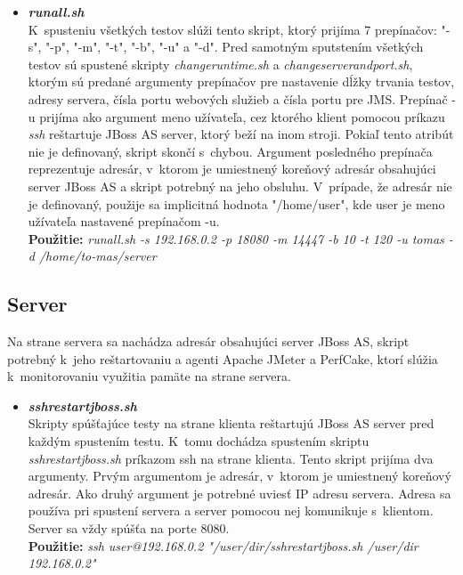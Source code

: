 \documentclass[12pt,oneside,final]{fithesis-utf8}
\newcommand\underscore[1]{\underline{\hspace{8pt}}}
\begin{document}
\begin{itemize}
\item \textit{\textbf{run\underscore{}all.sh}}\\
K~spusteniu všetkých testov slúži tento skript, ktorý prijíma 7 prepínačov: "{}-s"{}, "{}-p"{}, "{}-m"{}, "{}-t"{}, "{}-b"{}, "{}-u"{} a "{}-d"{}. Pred samotným sputstením všetkých testov sú spustené skripty \textit{change\underscore{}runtime.sh} a \textit{change\underscore{}server\underscore{}and\underscore{}port.sh}, ktorým sú predané argumenty prepínačov pre nastavenie dĺžky trvania testov, adresy servera, čísla portu webových služieb a čísla portu pre JMS. Prepínač -u prijíma ako argument meno užívateľa, cez ktorého klient pomocou príkazu \textit{ssh} reštartuje JBoss AS server, ktorý beží na inom stroji. Pokiaľ tento atribút nie je definovaný, skript skončí s~chybou. Argument posledného prepínača reprezentuje adresár, v~ktorom je umiestnený koreňový adresár obsahujúci server JBoss AS a skript potrebný na jeho obsluhu. V~prípade, že adresár nie je definovaný, použije sa implicitná hodnota "{/home/user}"{}, kde user je meno užívateľa nastavené prepínačom -u.\\
\textbf{Použitie:} \textit{run\underscore{}all.sh -s 192.168.0.2 -p 18080 -m 14447 -b 10 -t 120 -u tomas -d /home/to-mas/server}

\end{itemize}

\newpage
\subsection{Server}
Na strane servera sa nachádza adresár obsahujúci server JBoss AS, skript potrebný k~jeho reštartovaniu a agenti Apache JMeter a PerfCake, ktorí slúžia k~monitorovaniu využitia pamäte na strane servera.

\begin{itemize}

\item \textit{\textbf{ssh\underscore{}restart\underscore{}jboss.sh}}\\
Skripty spúšťajúce testy na strane klienta reštartujú JBoss AS server pred každým spustením testu. K~tomu dochádza spustením skriptu \textit{ssh\underscore{}restart\underscore{}jboss.sh} príkazom ssh na strane klienta. Tento skript prijíma dva argumenty. Prvým argumentom je adresár, v~ktorom je umiestnený koreňový adresár. Ako druhý argument je potrebné uviesť IP adresu servera. Adresa sa používa pri spustení servera a server pomocou nej komunikuje s~klientom. Server sa vždy spúšťa na porte 8080.\\
\textbf{Použitie:} \textit{ssh user@192.168.0.2 "/user/dir/ssh\underscore{}restart\underscore{}jboss.sh /user/dir 192.168.0.2"}
\end{itemize}
\end{document}
